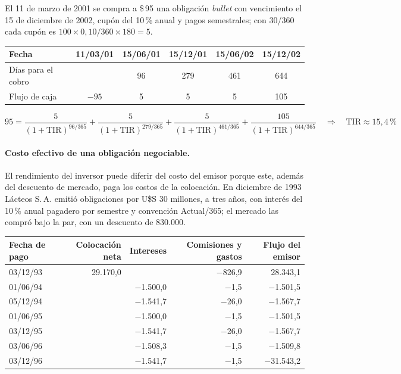 \begin{ejemplo}
El 11 de marzo de 2001 se compra a \$\,95 una obligación \emph{bullet} con vencimiento el 15 de diciembre de 2002, cupón del 10\,\% anual y pagos semestrales; con 30/360 cada cupón es $100\times 0{,}10/360\times 180 = 5$.
\begin{center}
\begin{tabular}{@{}lccccc@{}}
\toprule
Fecha & 11/03/01 & 15/06/01 & 15/12/01 & 15/06/02 & 15/12/02\\
\midrule
Días para el cobro & & 96 & 279 & 461 & 644\\
Flujo de caja & $-95$ & 5 & 5 & 5 & 105\\
\bottomrule
\end{tabular}
\end{center}
\[
95 = \frac{5}{(1+\text{TIR})^{96/365}} + \frac{5}{(1+\text{TIR})^{279/365}} + \frac{5}{(1+\text{TIR})^{461/365}} + \frac{105}{(1+\text{TIR})^{644/365}}
\quad\Longrightarrow\quad \text{TIR} \approx 15{,}4\,\%
\]
\end{ejemplo}

\paragraph{Costo efectivo de una obligación negociable.} El rendimiento del inversor puede diferir del costo del emisor porque este, además del descuento de mercado, paga los costos de la colocación. En diciembre de 1993 Lácteos S.\,A. emitió obligaciones por U\$S 30 millones, a tres años, con interés del 10\,\% anual pagadero por semestre y convención Actual/365; el mercado las compró bajo la par, con un descuento de 830.000.

\begin{center}
\small
\begin{tabular}{@{}lrrrr@{}}
\toprule
Fecha de pago & Colocación neta & Intereses & Comisiones y gastos & Flujo del emisor\\
\midrule
03/12/93 & 29.170,0 & & $-$826,9 & 28.343,1\\
01/06/94 & & $-$1.500,0 & $-$1,5 & $-$1.501,5\\
05/12/94 & & $-$1.541,7 & $-$26,0 & $-$1.567,7\\
01/06/95 & & $-$1.500,0 & $-$1,5 & $-$1.501,5\\
03/12/95 & & $-$1.541,7 & $-$26,0 & $-$1.567,7\\
03/06/96 & & $-$1.508,3 & $-$1,5 & $-$1.509,8\\
03/12/96 & & $-$1.541,7 & $-$1,5 & $-$31.543,2\\
\bottomrule
\end{tabular}
\end{center}

